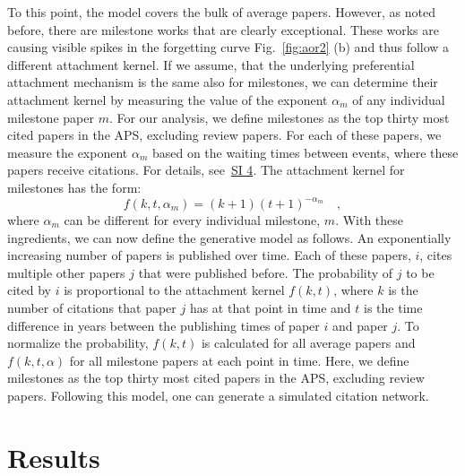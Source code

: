 \documentclass[fleqn,10pt]{wlscirep}
\begin{document}
To this point, the model covers the bulk of average papers. However, as noted before, there are milestone works that are clearly exceptional. These works are causing visible spikes in the forgetting curve Fig.~\ref{fig:aor2} (b) and thus follow a different attachment kernel. If we assume, that the underlying preferential attachment mechanism is the same also for milestones, we can determine their attachment kernel by measuring the value of the exponent $\alpha_m$ of any individual milestone paper $m$. For our analysis, we define milestones as the top thirty most cited papers in the APS, excluding review papers. For each of these papers, we measure the exponent $\alpha_m$ based on the waiting times between events, where these papers receive citations. For details, see~\hyperref[SI4]{SI 4}. The attachment kernel for milestones has the form:
%
\begin{equation}
   f(k, t, \alpha_m)= (k+1)(t+1)^{-\alpha_m} \quad,
\end{equation}
where $\alpha_m$ can be different for every individual milestone, $m$.
%
With these ingredients, we can now define the generative model as follows. An exponentially increasing number of papers is published over time. Each of these papers, $i$, cites multiple other papers $j$ that were published before. The probability of $j$ to be cited by $i$ is proportional to the attachment kernel $f(k, t)$, where $k$ is the number of citations that paper $j$ has at that point in time and $t$ is the time difference in years between the publishing times of paper $i$ and paper $j$. To normalize the probability, $f(k,t)$ is calculated for all average papers and  $f(k,t,\alpha)$ for all milestone papers at each point in time. Here, we define milestones as the top thirty most cited papers in the APS, excluding review papers. Following this model, one can generate a simulated citation network.

\section*{Results}
\end{document}

